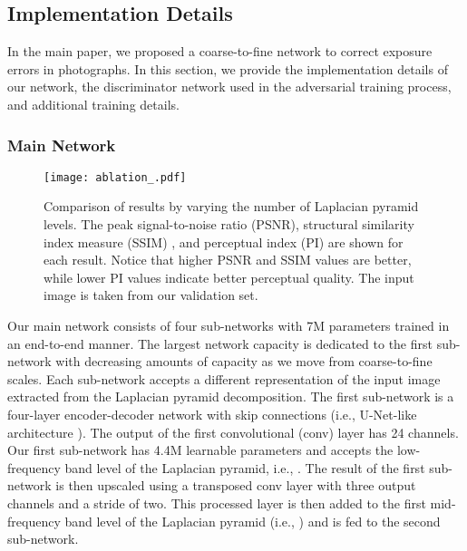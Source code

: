 \documentclass[final]{cvpr}
\begin{document}
\subsection{Implementation Details}\label{sec:implementation_details}


In the main paper, we proposed a coarse-to-fine network to correct exposure errors in photographs. In this section, we provide the implementation details of our network, the discriminator network used in the adversarial training process, and additional training details. 

\subsubsection{Main Network}



\begin{figure*}[t]
\centering
\texttt{[image: ablation\_.pdf]}
\vspace{-7mm}
\caption{Comparison of results by varying the number of Laplacian pyramid levels. 
The peak signal-to-noise ratio (PSNR), structural similarity index measure (SSIM) \cite{wang2004image}, and perceptual index (PI) \cite{blau20182018} are shown for each result. Notice that higher PSNR and SSIM values are better, while lower PI values indicate better perceptual quality. The input image is taken from our validation set.\vspace{-2mm}}
\label{fig:ablation1}
\end{figure*}

Our main network consists of four sub-networks with 7M parameters trained in an end-to-end manner. The largest network capacity is dedicated to the first sub-network with decreasing amounts of capacity as we move from coarse-to-fine scales. Each sub-network accepts a different representation of the input image extracted from the Laplacian pyramid decomposition. The first sub-network is a four-layer encoder-decoder network with skip connections (i.e., U-Net-like architecture  \cite{unet}). The output of the first convolutional (conv) layer has 24 channels. Our first sub-network has 4.4M learnable parameters and accepts the low-frequency band level of the Laplacian pyramid, i.e., . The result of the first sub-network is then upscaled using a  transposed conv layer with three output channels and a stride of two. This processed layer is then added to the first mid-frequency band level of the Laplacian pyramid (i.e., ) and is fed to the second sub-network. 
\end{document}
